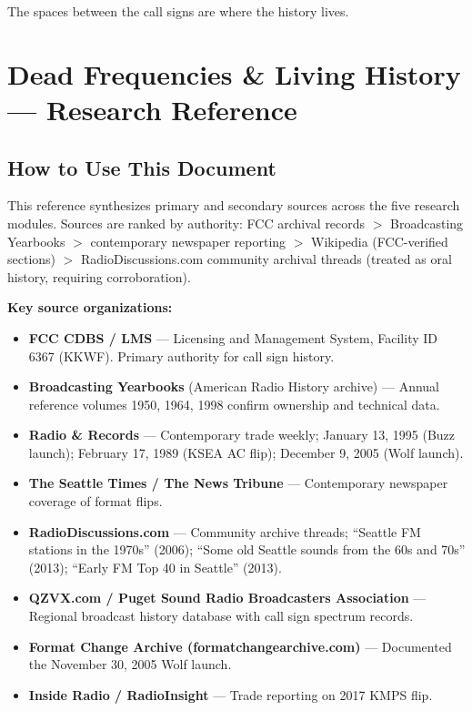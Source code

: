 \documentclass[11pt,letterpaper]{article}
\newcommand{\stageheader}[2]{%
  \noindent\colorbox{#2}{\makebox[\textwidth][l]{%
    \textcolor{white}{\bfseries\sffamily\hspace{6pt}#1\hspace{6pt}}}}%
  \vspace{0.5em}\par%
}
\begin{document}
The spaces between the call signs are where the history lives.

\newpage
\stageheader{STAGE 2 --- RESEARCH REFERENCE}{secondary}

\section{Dead Frequencies \& Living History --- Research Reference}

\subsection{How to Use This Document}

This reference synthesizes primary and secondary sources across the five research modules. Sources are ranked by authority: FCC archival records $>$ Broadcasting Yearbooks $>$ contemporary newspaper reporting $>$ Wikipedia (FCC-verified sections) $>$ RadioDiscussions.com community archival threads (treated as oral history, requiring corroboration).

\textbf{Key source organizations:}
\begin{itemize}[leftmargin=2em]
  \item \textbf{FCC CDBS / LMS} --- Licensing and Management System, Facility ID 6367 (KKWF). Primary authority for call sign history.
  \item \textbf{Broadcasting Yearbooks} (American Radio History archive) --- Annual reference volumes 1950, 1964, 1998 confirm ownership and technical data.
  \item \textbf{Radio \& Records} --- Contemporary trade weekly; January 13, 1995 (Buzz launch); February 17, 1989 (KSEA AC flip); December 9, 2005 (Wolf launch).
  \item \textbf{The Seattle Times / The News Tribune} --- Contemporary newspaper coverage of format flips.
  \item \textbf{RadioDiscussions.com} --- Community archive threads; ``Seattle FM stations in the 1970s'' (2006); ``Some old Seattle sounds from the 60s and 70s'' (2013); ``Early FM Top 40 in Seattle'' (2013).
  \item \textbf{QZVX.com / Puget Sound Radio Broadcasters Association} --- Regional broadcast history database with call sign spectrum records.
  \item \textbf{Format Change Archive (formatchangearchive.com)} --- Documented the November 30, 2005 Wolf launch.
  \item \textbf{Inside Radio / RadioInsight} --- Trade reporting on 2017 KMPS flip.
\end{itemize}
\end{document}
